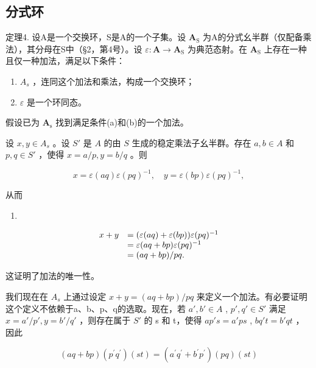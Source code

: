 \subsection{分式环}

定理4. 设A是一个交换环，S是A的一个子集。设 \(\mathbf{A}_{\mathrm{S}}\) 为A的分式幺半群（仅配备乘法），其分母在S中（§2，第4号）。设 \(\varepsilon: \mathbf{A} \to \mathbf{A}_{\mathrm{S}}\) 为典范态射。在 \(\mathbf{A}_{\mathrm{S}}\) 上存在一种且仅一种加法，满足以下条件：

\begin{enumerate}
\def\labelenumi{(\alph{enumi})}
\item
  \(A_{s}\) ，连同这个加法和乘法，构成一个交换环；
\item
  \(\varepsilon\) 是一个环同态。
\end{enumerate}

假设已为 \(\mathbf{A}_{\mathrm{s}}\) 找到满足条件(a)和(b)的一个加法。

设 \(x, y \in A_s\) 。设 \(S'\) 是 \(A\) 的由 \(S\) 生成的稳定乘法子幺半群。存在 \(a, b \in A\) 和 \(p, q \in S'\) ，使得 \(x = a/p, y = b/q\) 。则

\[
x = \varepsilon (a q) \varepsilon (p q) ^ {- 1}, \quad y = \varepsilon (b p) \varepsilon (p q) ^ {- 1},
\]

从而

\begin{enumerate}
\def\labelenumi{(\arabic{enumi})}
\setcounter{enumi}{22}
\tightlist
\item
\end{enumerate}

\[
\begin{array}{r l} x + y & = (\varepsilon (a q) + \varepsilon (b p)) \varepsilon (p q) ^ {- 1} \\ & = \varepsilon (a q + b p) \varepsilon (p q) ^ {- 1} \\ & = (a q + b p) / p q. \end{array}
\]

这证明了加法的唯一性。

我们现在在 \(A_{s}\) 上通过设定 \(x + y = (aq + bp)/pq\) 来定义一个加法。有必要证明这个定义不依赖于a、b、p、q的选取。现在，若 \(a', b' \in A\) , \(p', q' \in S'\) 满足 \(x = a'/p', y = b'/q'\) ，则存在属于 \(S'\) 的 s 和 t，使得 \(ap's = a'ps\) , \(bq't = b'qt\) ，因此

\[
(a q + b p) \left(p ^ {\prime} q ^ {\prime}\right) (s t) = \left(a ^ {\prime} q ^ {\prime} + b ^ {\prime} p ^ {\prime}\right) (p q) (s t)
\]

